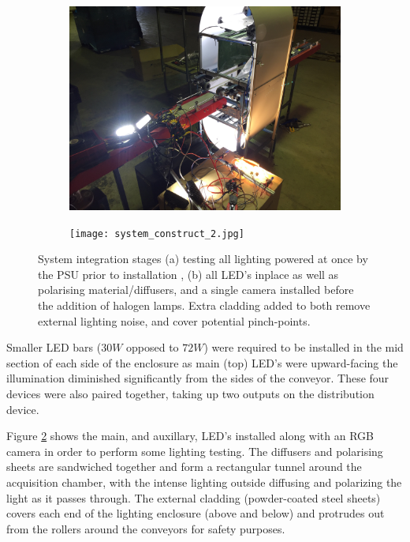 \documentclass[fleqn,twoside,12pt]{report}
\begin{document}
\begin{figure}[ht!]
	\centering
	\begin{subfigure}{.5\textwidth}
		\centering
		\includegraphics[width=.9\linewidth]{system_construct_1.JPG}
		\caption{}
		\label{fig:system_construct_1}
	\end{subfigure}%
	\begin{subfigure}{.5\textwidth}
		\centering
		\texttt{[image: system\_construct\_2.jpg]}
		\caption{}
		\label{fig:system_construct_2}
	\end{subfigure}%
	\caption{System integration stages (a) testing all lighting powered at once by the PSU prior to installation , (b) all LED's inplace as well as polarising material/diffusers, and a single camera installed before the addition of halogen lamps. Extra cladding added to both remove external lighting noise, and cover potential pinch-points.}
	\label{}
\end{figure}

Smaller LED bars ($30W$ opposed to $72W$) were required to be installed in the mid section of each side of the enclosure as main (top) LED's were upward-facing the illumination diminished significantly from the sides of the conveyor. These four devices were also paired together, taking up two outputs on the distribution device. 


Figure \ref{fig:system_construct_2} shows the main, and auxillary, LED's installed along with an RGB camera in order to perform some lighting testing. The diffusers and polarising sheets are sandwiched together and form a rectangular tunnel around the acquisition chamber, with the intense lighting outside diffusing and polarizing the light as it passes through. The external cladding (powder-coated steel sheets) covers each end of the lighting enclosure (above and below) and protrudes out from the rollers around the conveyors for safety purposes. 
\end{document}
